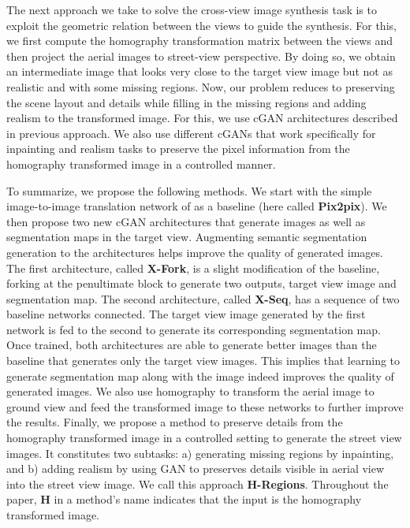 \documentclass[times,twocolumn,final,authoryear]{elsarticle_modified}
\begin{document}
The next approach we take to solve the cross-view image synthesis task is to exploit the geometric relation between the views to guide the synthesis. For this, we first compute the homography transformation matrix between the views and then project the aerial images to street-view perspective. By doing so, we obtain an intermediate image that looks very close to the target view image but not as realistic and with some missing regions. Now, our problem reduces to preserving the scene layout and details while filling in the missing regions and adding realism to the transformed image. For this, we use cGAN architectures described in previous approach. We also use different cGANs that work specifically for inpainting and realism tasks to preserve the pixel information from the homography transformed image in a controlled manner.











To summarize, we propose the following methods. We start with the simple image-to-image translation network of \cite{pix2pix2017} as a baseline (here called {\bf Pix2pix}). We then propose two new cGAN architectures that generate images as well as segmentation maps in the target view. Augmenting semantic segmentation generation to the architectures helps improve the quality of generated images. The first architecture, called {\bf X-Fork}, is a slight modification of the baseline, forking at the penultimate block to generate two outputs, target view image and segmentation map. The second architecture, called {\bf X-Seq}, has a sequence of two baseline networks connected. The target view image generated by the first network is fed to the second to generate its corresponding segmentation map. Once trained, both architectures are able to generate better images than the baseline that generates only the target view images. This implies that learning to generate segmentation map along with the image indeed improves the quality of generated images. We also use homography to transform the aerial image to ground view and feed the transformed image to these networks to further improve the results. Finally, we propose a method to preserve details from the homography transformed image in a controlled setting to generate the street view images. It constitutes two subtasks: a) generating missing regions by inpainting, and b) adding realism by using GAN to preserves details visible in aerial view into the street view image. We call this approach {\bf H-Regions}. Throughout the paper, {\bf H} in a method's name indicates that the input is the homography transformed image. 
\end{document}
